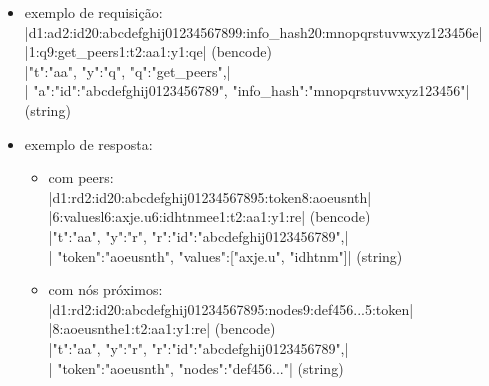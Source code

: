 \newpage
\begin{itemize}
    \item exemplo de requisição: \\
        \bverb|d1:ad2:id20:abcdefghij01234567899:info_hash20:mnopqrstuvwxyz123456e|\\
        \bverb|1:q9:get_peers1:t2:aa1:y1:qe| (\gls*{bencode}) \\
        \sverb|{"t":"aa", "y":"q", "q":"get_peers",|\\
        \sverb| "a":{"id":"abcdefghij0123456789", "info_hash":"mnopqrstuvwxyz123456"}}| (\gls*{string})

    \item exemplo de resposta:
        \begin{itemize}
            \item com \glspl*{peer}: \\
                \bverb|d1:rd2:id20:abcdefghij01234567895:token8:aoeusnth|\\
                \bverb|6:valuesl6:axje.u6:idhtnmee1:t2:aa1:y1:re| (\gls*{bencode}) \\
                \sverb|{"t":"aa", "y":"r", "r":{"id":"abcdefghij0123456789",|\\
                \sverb| "token":"aoeusnth", "values":["axje.u", "idhtnm"]}}|
                (\gls*{string})

            \item com nós próximos: \\
                \bverb|d1:rd2:id20:abcdefghij01234567895:nodes9:def456...5:token|\\\bverb|8:aoeusnthe1:t2:aa1:y1:re| (\gls*{bencode}) \\
                \sverb|{"t":"aa", "y":"r", "r":{"id":"abcdefghij0123456789",|\\
                \sverb| "token":"aoeusnth", "nodes":"def456..."}}| (\gls*{string})
        \end{itemize}
\end{itemize}
